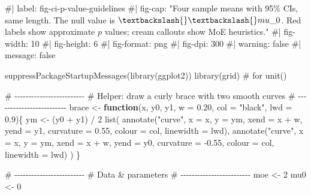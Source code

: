\documentclass[
  letterpaper,
  DIV=11,
  numbers=noendperiod]{scrreprt}
\newenvironment{Shaded}{\begin{snugshade}}{\end{snugshade}}
\newcommand{\AttributeTok}[1]{\textcolor[rgb]{0.40,0.45,0.13}{#1}}
\newcommand{\CommentTok}[1]{\textcolor[rgb]{0.37,0.37,0.37}{#1}}
\newcommand{\ControlFlowTok}[1]{\textcolor[rgb]{0.00,0.23,0.31}{\textbf{#1}}}
\newcommand{\DecValTok}[1]{\textcolor[rgb]{0.68,0.00,0.00}{#1}}
\newcommand{\FloatTok}[1]{\textcolor[rgb]{0.68,0.00,0.00}{#1}}
\newcommand{\FunctionTok}[1]{\textcolor[rgb]{0.28,0.35,0.67}{#1}}
\newcommand{\NormalTok}[1]{\textcolor[rgb]{0.00,0.23,0.31}{#1}}
\newcommand{\OtherTok}[1]{\textcolor[rgb]{0.00,0.23,0.31}{#1}}
\newcommand{\SpecialCharTok}[1]{\textcolor[rgb]{0.37,0.37,0.37}{#1}}
\newcommand{\StringTok}[1]{\textcolor[rgb]{0.13,0.47,0.30}{#1}}
\begin{document}
\begin{Shaded}
\begin{Highlighting}[]
\CommentTok{\#| label: fig{-}ci{-}p{-}value{-}guidelines}
\CommentTok{\#| fig{-}cap: "Four sample means with 95\% CIs, same length. The null value is $\textbackslash{}\textbackslash{}mu\_0$. Red labels show approximate $p$ values; cream callouts show MoE heuristics."}
\CommentTok{\#| fig{-}width: 10}
\CommentTok{\#| fig{-}height: 6}
\CommentTok{\#| fig{-}format: png}
\CommentTok{\#| fig{-}dpi: 300}
\CommentTok{\#| warning: false}
\CommentTok{\#| message: false}

\FunctionTok{suppressPackageStartupMessages}\NormalTok{(}\FunctionTok{library}\NormalTok{(ggplot2))}
\FunctionTok{library}\NormalTok{(grid)  }\CommentTok{\# for unit()}

\CommentTok{\# {-}{-}{-}{-}{-}{-}{-}{-}{-}{-}{-}{-}{-}{-}{-}{-}{-}{-}{-}{-}{-}{-}{-}{-}{-}}
\CommentTok{\# Helper: draw a curly brace with two smooth curves}
\CommentTok{\# {-}{-}{-}{-}{-}{-}{-}{-}{-}{-}{-}{-}{-}{-}{-}{-}{-}{-}{-}{-}{-}{-}{-}{-}{-}}
\NormalTok{brace }\OtherTok{\textless{}{-}} \ControlFlowTok{function}\NormalTok{(x, y0, y1, }\AttributeTok{w =} \FloatTok{0.20}\NormalTok{, }\AttributeTok{col =} \StringTok{"black"}\NormalTok{, }\AttributeTok{lwd =} \FloatTok{0.9}\NormalTok{)\{}
\NormalTok{  ym }\OtherTok{\textless{}{-}}\NormalTok{ (y0 }\SpecialCharTok{+}\NormalTok{ y1) }\SpecialCharTok{/} \DecValTok{2}
  \FunctionTok{list}\NormalTok{(}
    \FunctionTok{annotate}\NormalTok{(}\StringTok{"curve"}\NormalTok{, }\AttributeTok{x =}\NormalTok{ x,   }\AttributeTok{y =}\NormalTok{ ym, }\AttributeTok{xend =}\NormalTok{ x }\SpecialCharTok{+}\NormalTok{ w, }\AttributeTok{yend =}\NormalTok{ y1,}
             \AttributeTok{curvature =} \FloatTok{0.55}\NormalTok{, }\AttributeTok{colour =}\NormalTok{ col, }\AttributeTok{linewidth =}\NormalTok{ lwd),}
    \FunctionTok{annotate}\NormalTok{(}\StringTok{"curve"}\NormalTok{, }\AttributeTok{x =}\NormalTok{ x,   }\AttributeTok{y =}\NormalTok{ ym, }\AttributeTok{xend =}\NormalTok{ x }\SpecialCharTok{+}\NormalTok{ w, }\AttributeTok{yend =}\NormalTok{ y0,}
             \AttributeTok{curvature =} \SpecialCharTok{{-}}\FloatTok{0.55}\NormalTok{, }\AttributeTok{colour =}\NormalTok{ col, }\AttributeTok{linewidth =}\NormalTok{ lwd)}
\NormalTok{  )}
\NormalTok{\}}

\CommentTok{\# {-}{-}{-}{-}{-}{-}{-}{-}{-}{-}{-}{-}{-}{-}{-}{-}{-}{-}{-}{-}{-}{-}{-}{-}{-}}
\CommentTok{\# Data \& parameters}
\CommentTok{\# {-}{-}{-}{-}{-}{-}{-}{-}{-}{-}{-}{-}{-}{-}{-}{-}{-}{-}{-}{-}{-}{-}{-}{-}{-}}
\NormalTok{moe }\OtherTok{\textless{}{-}} \DecValTok{2}
\NormalTok{mu0 }\OtherTok{\textless{}{-}} \DecValTok{0}


\end{Highlighting}
\end{Shaded}
\end{document}
